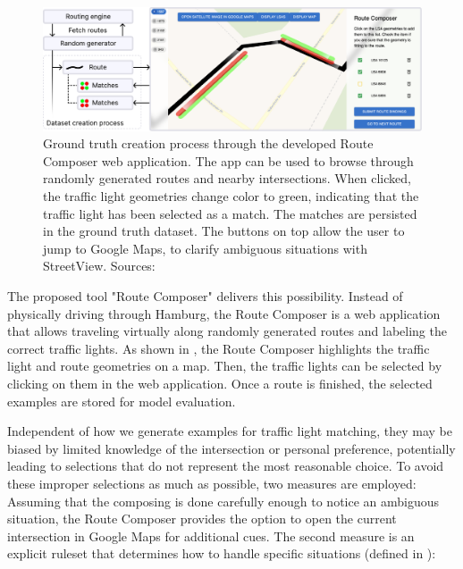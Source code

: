 \begin{figure}[t]
\centering
\includegraphics[width=\linewidth]{images/sg-selection-ground-truth.pdf}
\caption{Ground truth creation process through the developed Route Composer web application. The app can be used to browse through randomly generated routes and nearby intersections. When clicked, the traffic light geometries change color to green, indicating that the traffic light has been selected as a match. The matches are persisted in the ground truth dataset. The buttons on top allow the user to jump to Google Maps, to clarify ambiguous situations with StreetView. Sources: \cite{matthes2022matching, matthes2023geo}}
\label{fig:sg-selection-ground-truth}
\end{figure}

The proposed tool "Route Composer" delivers this possibility. Instead of physically driving through Hamburg, the Route Composer is a web application that allows traveling virtually along randomly generated routes and labeling the correct traffic lights. As shown in , the Route Composer highlights the traffic light and route geometries on a map. Then, the traffic lights can be selected by clicking on them in the web application. Once a route is finished, the selected examples are stored for model evaluation.

Independent of how we generate examples for traffic light matching, they may be biased by limited knowledge of the intersection or personal preference, potentially leading to selections that do not represent the most reasonable choice. To avoid these improper selections as much as possible, two measures are employed: Assuming that the composing is done carefully enough to notice an ambiguous situation, the Route Composer provides the option to open the current intersection in Google Maps for additional cues. The second measure is an explicit ruleset that determines how to handle specific situations (defined in \cite{matthes2023geo}):

